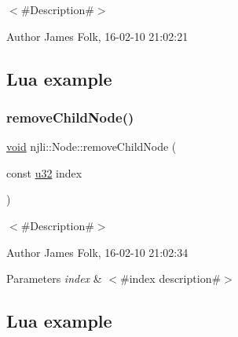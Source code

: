 $<$\#\+Description\#$>$ 

\begin{DoxyAuthor}{Author}
James Folk, 16-\/02-\/10 21\+:02\+:21
\end{DoxyAuthor}
\hypertarget{classnjli_1_1_steering_behavior_wander_ex1}{}\subsection{Lua example}\label{classnjli_1_1_steering_behavior_wander_ex1}

\begin{DoxyCodeInclude}
\end{DoxyCodeInclude}
\mbox{\label{classnjli_1_1_node_ae82a40147b291452e191899dbad90a42}} 
\subsubsection{\texorpdfstring{remove\+Child\+Node()}{removeChildNode()}\hspace{0.1cm}{\footnotesize\ttfamily [1/2]}}
{\footnotesize\ttfamily \mbox{\hyperlink{_thread_8h_af1e856da2e658414cb2456cb6f7ebc66}{void}} njli\+::\+Node\+::remove\+Child\+Node (\begin{DoxyParamCaption}\item[{const \mbox{\hyperlink{_util_8h_a10e94b422ef0c20dcdec20d31a1f5049}{u32}}}]{index }\end{DoxyParamCaption})}



$<$\#\+Description\#$>$ 

\begin{DoxyAuthor}{Author}
James Folk, 16-\/02-\/10 21\+:02\+:34
\end{DoxyAuthor}

\begin{DoxyParams}{Parameters}
{\em index} & $<$\#index description\#$>$\\
\hline
\end{DoxyParams}
\hypertarget{classnjli_1_1_steering_behavior_wander_ex1}{}\subsection{Lua example}\label{classnjli_1_1_steering_behavior_wander_ex1}

